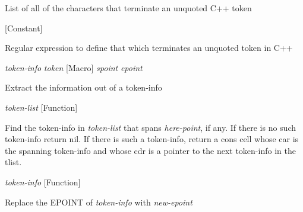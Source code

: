 \begin{doc-string}
List of all of the characters that terminate an unquoted C++ token
\end{doc-string}

\vspace{1em}
\noindent
{}
\usebox{\funcname}
 \hfill [Constant]

\begin{doc-string}
Regular expression to define that which terminates an unquoted token in C++
\end{doc-string}

\vspace{1em}
\noindent
{}
\usebox{\funcname}\emph{token-info} \emph{token}
 \hfill [Macro]
\hspace*{\wd\funcname}\emph{spoint} \emph{epoint}
\hspace*{\wd\funcname}

\begin{doc-string}
Extract the information out of a token-info
\end{doc-string}

\vspace{1em}
\noindent
{}
\usebox{\funcname}\emph{token-list}
 \hfill [Function]
\hspace*{\wd\funcname}

\begin{doc-string}
Find the token-info in \emph{token-list} that spans \emph{here-point}, if any.  If there
is no such token-info return nil.  If there is such a token-info, return a
cons cell whose car is the spanning token-info and whose cdr is a pointer
to the next token-info in the tlist.
\end{doc-string}

\vspace{1em}
\noindent
{}
\usebox{\funcname}\emph{token-info}
 \hfill [Function]
\hspace*{\wd\funcname}

\begin{doc-string}
Replace the EPOINT of \emph{token-info} with \emph{new-epoint}
\end{doc-string}

